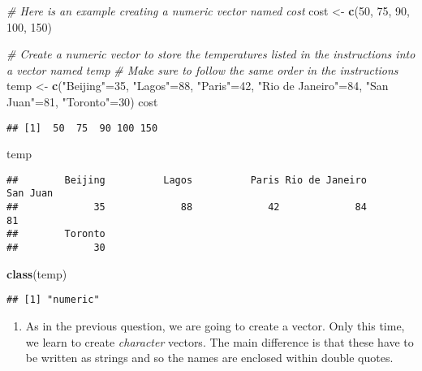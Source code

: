 \documentclass[]{article}
\newenvironment{Shaded}{\begin{snugshade}}{\end{snugshade}}
\newcommand{\CommentTok}[1]{\textcolor[rgb]{0.56,0.35,0.01}{\textit{#1}}}
\newcommand{\DecValTok}[1]{\textcolor[rgb]{0.00,0.00,0.81}{#1}}
\newcommand{\KeywordTok}[1]{\textcolor[rgb]{0.13,0.29,0.53}{\textbf{#1}}}
\newcommand{\NormalTok}[1]{#1}
\newcommand{\StringTok}[1]{\textcolor[rgb]{0.31,0.60,0.02}{#1}}
\providecommand{\tightlist}{%
  \setlength{\itemsep}{0pt}\setlength{\parskip}{0pt}}
\begin{document}
\begin{Shaded}
\begin{Highlighting}[]
\CommentTok{# Here is an example creating a numeric vector named cost}
\NormalTok{cost <-}\StringTok{ }\KeywordTok{c}\NormalTok{(}\DecValTok{50}\NormalTok{, }\DecValTok{75}\NormalTok{, }\DecValTok{90}\NormalTok{, }\DecValTok{100}\NormalTok{, }\DecValTok{150}\NormalTok{)}

\CommentTok{# Create a numeric vector to store the temperatures listed in the instructions into a vector named temp}
\CommentTok{# Make sure to follow the same order in the instructions}
\NormalTok{temp <-}\StringTok{ }\KeywordTok{c}\NormalTok{(}\StringTok{"Beijing"}\NormalTok{=}\DecValTok{35}\NormalTok{, }\StringTok{"Lagos"}\NormalTok{=}\DecValTok{88}\NormalTok{, }\StringTok{"Paris"}\NormalTok{=}\DecValTok{42}\NormalTok{, }\StringTok{"Rio de Janeiro"}\NormalTok{=}\DecValTok{84}\NormalTok{, }\StringTok{"San Juan"}\NormalTok{=}\DecValTok{81}\NormalTok{, }\StringTok{"Toronto"}\NormalTok{=}\DecValTok{30}\NormalTok{)}
\NormalTok{cost}
\end{Highlighting}
\end{Shaded}

\begin{verbatim}
## [1]  50  75  90 100 150
\end{verbatim}

\begin{Shaded}
\begin{Highlighting}[]
\NormalTok{temp}
\end{Highlighting}
\end{Shaded}

\begin{verbatim}
##        Beijing          Lagos          Paris Rio de Janeiro       San Juan 
##             35             88             42             84             81 
##        Toronto 
##             30
\end{verbatim}

\begin{Shaded}
\begin{Highlighting}[]
\KeywordTok{class}\NormalTok{(temp)}
\end{Highlighting}
\end{Shaded}

\begin{verbatim}
## [1] "numeric"
\end{verbatim}

\begin{enumerate}
\def\labelenumi{\arabic{enumi}.}
\setcounter{enumi}{1}
\tightlist
\item
  As in the previous question, we are going to create a vector. Only
  this time, we learn to create \emph{character} vectors. The main
  difference is that these have to be written as strings and so the
  names are enclosed within double quotes.
\end{enumerate}
\end{document}

